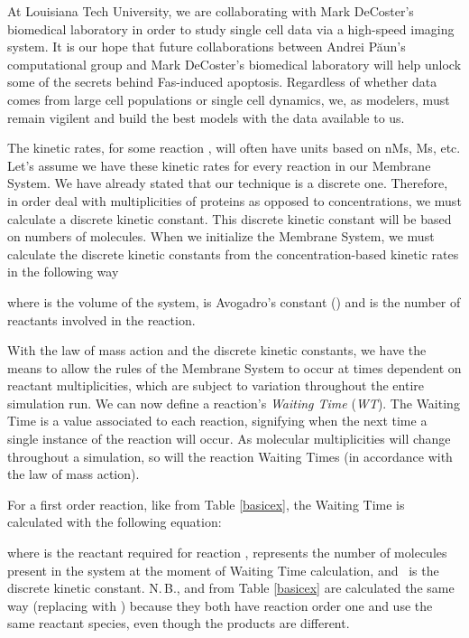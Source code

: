 \documentclass[copyright]{eptcs}
\newcommand{\noi}{\noindent}
\begin{document}
At Louisiana Tech University, we are collaborating with Mark DeCoster's biomedical laboratory in order to study single cell data via a high-speed imaging system.  It is our hope that future collaborations between Andrei P\u aun's computational group and Mark DeCoster's biomedical laboratory will help unlock some of the secrets behind Fas-induced apoptosis.  Regardless of whether data comes from large cell populations or single cell dynamics, we, as modelers, must remain vigilent and build the best models with the data available to us.

The kinetic rates,  for some reaction , will often have units based on nMs, Ms, etc.  Let's assume we have these kinetic rates for every reaction in our Membrane System.  We have already stated that our technique is a discrete one.  Therefore, in order deal with multiplicities of proteins as opposed to concentrations, we must calculate a discrete kinetic constant.  This discrete kinetic constant will be based on numbers of molecules.  When we initialize the Membrane System, we must calculate the discrete kinetic constants from the concentration-based kinetic rates in the following way


\noi where  is the volume of the system,  is Avogadro's constant () and  is the number of reactants involved in the reaction.

With the law of mass action and the discrete kinetic constants, we have the means to allow the rules of the Membrane System to occur at times dependent on reactant multiplicities, which are subject to variation throughout the entire simulation run.  We can now define a reaction's \emph{Waiting Time} (\emph{WT}).  The Waiting Time is a value associated to each reaction, signifying when the next time a single instance of the reaction will occur.  As molecular multiplicities will change throughout a simulation, so will the reaction Waiting Times (in accordance with the law of mass action).



For a first order reaction, like  from Table \ref{basicex}, the Waiting Time is calculated with the following equation:


\noi where  is the reactant required for reaction ,  represents the number of molecules present in the system at the moment of Waiting Time calculation, and~ is the discrete kinetic constant.  N.\,B.,  and  from Table \ref{basicex} are calculated the same way (replacing  with ) because they both have reaction order one and use the same reactant species, even though the products are different.
\end{document}
